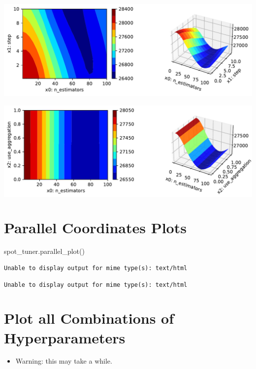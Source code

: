 \documentclass[
  letterpaper,
  DIV=11,
  numbers=noendperiod]{scrreprt}
\newenvironment{Shaded}{\begin{snugshade}}{\end{snugshade}}
\newcommand{\NormalTok}[1]{\textcolor[rgb]{0.00,0.23,0.31}{#1}}
\providecommand{\tightlist}{%
  \setlength{\itemsep}{0pt}\setlength{\parskip}{0pt}}\usepackage{longtable,booktabs,array}
\begin{document}
\includegraphics{025_spot_hpt_river_friedman_amfr_files/figure-pdf/cell-36-output-3.pdf}

\includegraphics{025_spot_hpt_river_friedman_amfr_files/figure-pdf/cell-36-output-4.pdf}

\section{Parallel Coordinates Plots}\label{parallel-coordinates-plots}

\begin{Shaded}
\begin{Highlighting}[]
\NormalTok{spot\_tuner.parallel\_plot()}
\end{Highlighting}
\end{Shaded}

\begin{verbatim}
Unable to display output for mime type(s): text/html
\end{verbatim}

\begin{verbatim}
Unable to display output for mime type(s): text/html
\end{verbatim}

\section{Plot all Combinations of
Hyperparameters}\label{plot-all-combinations-of-hyperparameters}

\begin{itemize}
\tightlist
\item
  Warning: this may take a while.
\end{itemize}
\end{document}

